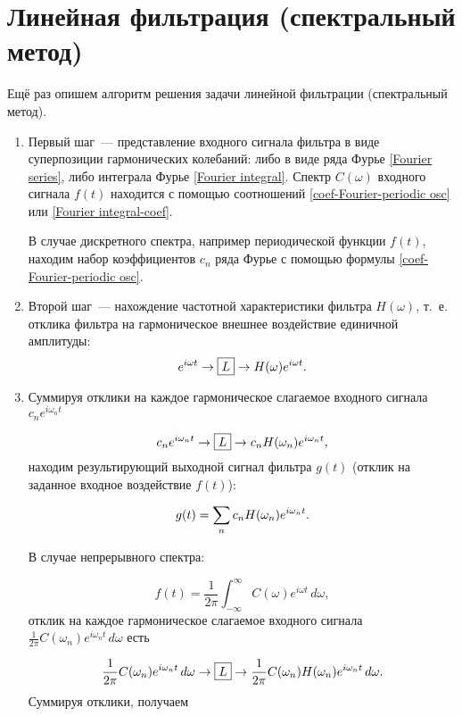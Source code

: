 \section{Линейная фильтрация (спектральный метод)}
Ещё раз опишем алгоритм решения задачи линейной фильтрации (спектральный метод).
\begin{enumerate} 
	\item Первый шаг~--- представление входного сигнала фильтра в виде суперпозиции гармонических колебаний: либо в виде ряда Фурье \eqref{Fourier series}, либо интеграла Фурье \eqref{Fourier integral}. Спектр $C(\omega)$ входного сигнала $f(t)$ находится с помощью соотношений \eqref{coef-Fourier-periodic osc} или \eqref{Fourier integral-coef}.

В случае дискретного спектра, например периодической функции $f(t)$, находим набор коэффициентов $c_n$ ряда Фурье с
помощью формулы \eqref{coef-Fourier-periodic osc}.

	\item Второй шаг~--- нахождение частотной характеристики фильтра $H(\omega)$, т.~е. отклика фильтра на гармоническое
внешнее воздействие единичной амплитуды:
\begin{equation*}
	e^{i\omega t}\to\fbox{$L$}\to H(\omega)e^{i\omega t}.
\end{equation*}

	\item Суммируя отклики на каждое гармоническое слагаемое входного сигнала $c_n e^{i\omega_n t}$

\begin{equation*}
	c_n e^{i\omega_n t} \to\fbox{$L$}\to c_n H(\omega_n)e^{i\omega_n t},
\end{equation*}
находим результирующий выходной сигнал фильтра $g(t)$ (отклик на заданное входное воздействие $f(t)$):

\begin{equation}
	\eqmark{output signal}
	g(t)=\sum_n c_n H(\omega_n)e^{i\omega_n t}.
\end{equation}

В случае непрерывного спектра:

\begin{equation*}
	f(t)=\frac{1}{2\pi}\int_{-\infty}^\infty C(\omega)e^{i\omega t}\,d\omega,
\end{equation*}
отклик на каждое гармоническое слагаемое входного сигнала $\frac{1}{2\pi} C(\omega_n)e^{i\omega_n t}\,d\omega$ есть

\begin{equation*}
	\frac{1}{2\pi}C(\omega_n)e^{i\omega_n t}\,d\omega
\to\fbox{$L$}\to\frac{1}{2\pi}C(\omega_n)H(\omega_n)e^{i\omega_nt}\,d\omega.
\end{equation*}
Суммируя отклики, получаем


\end{enumerate}
